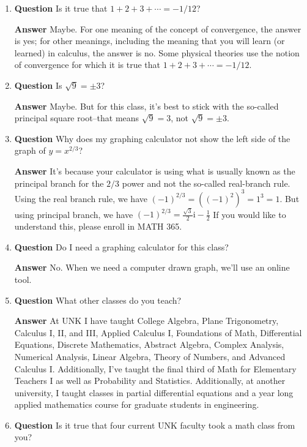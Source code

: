 \documentclass[11pt]{article}
\newcounter{ex}\setcounter{ex}{0}
\newcounter{cd}\setcounter{cd}{24}
\begin{document}
\begin{enumerate}
\item  \textbf{Question} Is it true that \(1 + 2 + 3 + \cdots = -1/12\)?

  \textbf{Answer}  Maybe. For one meaning of the concept of convergence, the answer is yes; for other meanings, including the meaning that you will learn (or learned)  in calculus, the answer is no.  Some physical theories use the notion of convergence for which it is true that \(1 + 2 + 3 + \cdots = -1/12\).

\item  \textbf{Question} Is \(\sqrt{9} = \pm 3\)?

  \textbf{Answer}  Maybe.  But for this class, it's best to stick with the so-called 
  principal square root--that means \(\sqrt{9} = 3\), not  \(\sqrt{9} = \pm 3\).

\item  \textbf{Question} Why does my graphing calculator not show the left side of the graph of \(y = x^{2/3}\)?

\textbf{Answer} It's because your calculator is using what is usually known as the principal branch for the \(2/3\) power and not the so-called real-branch rule.  Using the real branch rule,
we have \((-1)^{2/3} = ((-1)^2)^3 = 1^3 = 1\). But using principal branch, we have \((-1)^{2/3} = \frac{\sqrt{3}}{2}  \mathrm{i}  -\frac{1}{2}\) If you would like to understand this, please enroll in MATH 365.

\item \textbf{Question} Do I need a graphing calculator for this class?

\textbf{Answer} No. When we need a computer drawn graph, we'll use an online tool.

\item \textbf{Question} What other classes do you teach?

\textbf{Answer} At UNK I have taught College Algebra, 
   Plane Trigonometry, Calculus I, II, and III, Applied Calculus I,
   Foundations of Math, Differential Equations, Discrete Mathematics, Abstract Algebra, Complex Analysis,
   Numerical Analysis, Linear Algebra, Theory of Numbers, and Advanced Calculus I. Additionally, I've
   taught the final third of Math for Elementary Teachers I as well as  Probability and Statistics.
   Additionally, at another university, I taught classes in partial differential equations and a
   year long applied mathematics course for graduate students in engineering.

\item  \textbf{Question} Is it true that four current UNK faculty took a math class from you?


\end{enumerate}
\end{document}
